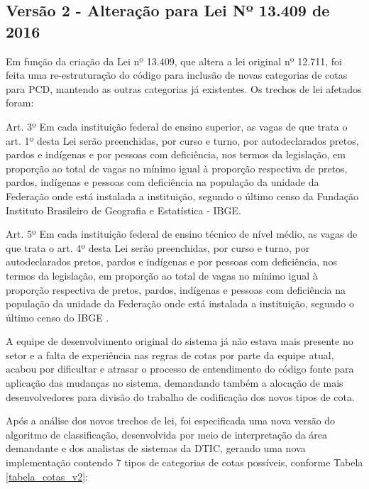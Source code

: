 \subsection{Versão 2 - Alteração para Lei Nº 13.409 de 2016 }
\label{versao2}
 Em função da criação da Lei nº 13.409, que altera a lei original nº 12.711, foi feita uma re-estruturação do código para inclusão de novas categorias de cotas para \gls{PCD}, mantendo as outras categorias já existentes. Os trechos de lei afetados foram:
\begin{citacao}
Art. 3º Em cada instituição federal de ensino superior, as vagas de que trata o art. 1º desta Lei serão preenchidas, por curso e turno, por autodeclarados pretos, pardos e indígenas e por pessoas com deficiência, nos termos da legislação, em proporção ao total de vagas no mínimo igual à proporção respectiva de pretos, pardos, indígenas e pessoas com deficiência na população da unidade da Federação onde está instalada a instituição, segundo o último censo da Fundação Instituto Brasileiro de Geografia e Estatística - IBGE.

Art. 5º Em cada instituição federal de ensino técnico de nível médio, as vagas de que trata o art. 4º desta Lei serão preenchidas, por curso e turno, por autodeclarados pretos, pardos e indígenas e por pessoas com deficiência, nos termos da legislação, em proporção ao total de vagas no mínimo igual à proporção respectiva de pretos, pardos, indígenas e pessoas com deficiência na população da unidade da Federação onde está instalada a instituição, segundo o último censo do IBGE \cite{leicotas2}.
\end{citacao}

A equipe de desenvolvimento original do sistema já não estava mais presente no setor e a falta de experiência nas regras de cotas por parte da equipe atual, acabou por dificultar e atrasar o processo de entendimento do código fonte para aplicação das mudanças no sistema,  demandando também a alocação de mais desenvolvedores para divisão do trabalho de codificação dos novos tipos de cota.

Após a análise dos novos trechos de lei, foi especificada uma nova versão do algoritmo de classificação, desenvolvida por meio de interpretação da área demandante e dos analistas de sistemas da \gls{DTIC}, gerando uma nova implementação contendo 7 tipos de categorias de cotas possíveis, conforme Tabela \ref{tabela_cotas_v2}:



